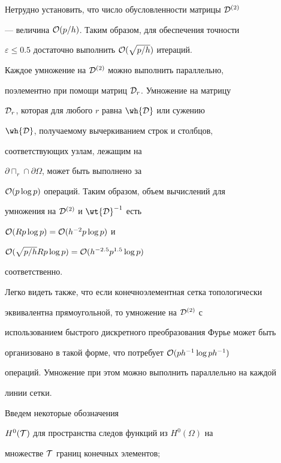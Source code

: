 \begin{notes}\label{rem6.1}


Нетрудно установить, что число обусловленности матрицы ${\cal D}^{(2)}$ 


--- величина ${\cal O}(p/h)$. Таким образом, для обеспечения точности 


$\varepsilon \leq 0.5$ достаточно выполнить ${\cal O}(\sqrt{p/h})$ итераций. 


Каждое умножение на ${\cal D}^{(2)}$ можно выполнить параллельно, 


поэлементно при помощи матриц ${\cal D}_r$. Умножение на матрицу 


${\cal D}_r$, которая для любого $r$ равна $\wh{{\cal D}}$ или сужению 


$\wh{{\cal D}}$, получаемому вычеркиванием строк и столбцов, 


соответствующих узлам, лежащим на 


$\partial\sqcap_r\cap\partial\Omega$, может быть выполнено за 


${\cal O}(p\log p)$ операций. Таким образом, объем вычислений для 


умножения на ${\cal D}^{(2)}$ и $\wt{{\cal D}}^{-1}$ есть 


${\cal O}(Rp\log p)= {\cal O}(h^{-2}p\log p)$ и 


${\cal O}(\sqrt{p/h} R p \log p) = {\cal O}(h^{-2.5}p^{1.5}\log p)$


соответственно.


Легко видеть также, что если конечноэлементная сетка топологически


эквивалентна прямоугольной, то умножение на ${\cal D}^{(2)}$ с 


использованием быстрого дискретного преобразования Фурье может быть 


организовано в такой форме, что потребует ${\cal O}(ph^{-1}\log ph^{-1})$ 


операций. Умножение при этом можно выполнить параллельно на каждой 


линии сетки. 


\end{notes}





Введем некоторые обозначения





$H^0({\cal T})$ для пространства следов функций из $H^0(\Omega)$ на 


множестве ${\cal T}$ границ конечных элементов;





